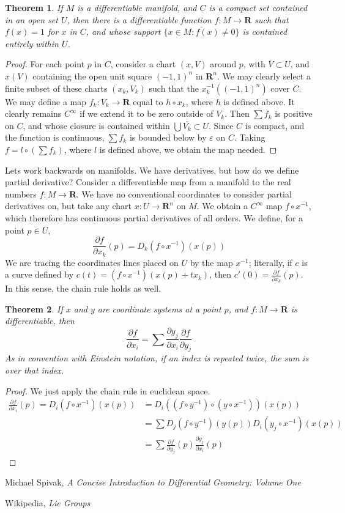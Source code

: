 \documentclass[12pt]{report}
\theoremstyle{plain}
\newtheorem{theorem}{Theorem}[chapter]
\theoremstyle{definition}
\begin{document}
\begin{theorem}
    If $M$ is a differentiable manifold, and $C$ is a compact set contained in an open set $U$, then there is a differentiable function $f:M \to \mathbf{R}$ such that $f(x) = 1$ for $x$ in $C$, and whose support $\overline{\{ x \in M : f(x) \neq 0 \}}$ is contained entirely within $U$.
\end{theorem}
\begin{proof}
    For each point $p$ in $C$, consider a chart $(x,V)$ around $p$, with $\overline{V} \subset U$, and $x(V)$ containing the open unit square $(-1,1)^n$ in $\mathbf{R}^n$. We may clearly select a finite subset of these charts $(x_k,V_k)$ such that the $x_k^{-1}((-1,1)^n)$ cover $C$. We may define a map $f_k:V_k \to \mathbf{R}$ equal to $h \circ x_k$, where $h$ is defined above. It clearly remains $C^\infty$ if we extend it to be zero outside of $V_k$. Then $\sum f_k$ is positive on $C$, and whose closure is contained within $\bigcup \overline{V_k} \subset U$. Since $C$ is compact, and the function is continuous, $\sum f_k$ is bounded below by $\varepsilon$ on $C$. Taking $f = l \circ (\sum f_k)$, where $l$ is defined above, we obtain the map needed.
\end{proof}

Lets work backwards on manifolds. We have derivatives, but how do we define partial derivative? Consider a differentiable map from a manifold to the real numbers $f:M \to \mathbf{R}$. We have no conventional coordinates to consider partial derivatives on, but take any chart $x:U \to \mathbf{R}^n$ on $M$. We obtain a $C^\infty$ map $f \circ x^{-1}$, which therefore has continuous partial derivatives of all orders. We define, for a point $p \in U$,
%
\[ \frac{\partial f}{\partial x_k} (p) = D_k(f \circ x^{-1})(x(p)) \]
%
We are tracing the coordinates lines placed on $U$ by the map $x^{-1}$; literally, if $c$ is a curve defined by $c(t) = (f \circ x^{-1})(x(p) + tx_k)$, then $c'(0) = \frac{\partial f}{\partial x_k}(p)$. In this sense, the chain rule holds as well.

\begin{theorem}
    If $x$ and $y$ are coordinate systems at a point $p$, and $f:M \to \mathbf{R}$ is differentiable, then
    \[ \frac{\partial f}{\partial x_i} = \sum \frac{\partial y_j}{\partial x_i} \frac{\partial f}{\partial y_j} \]
    As in convention with Einstein notation, if an index is repeated twice, the sum is over that index.
\end{theorem}
\begin{proof}
    We just apply the chain rule in euclidean space.
    \begin{align*}
        \frac{\partial f}{\partial x_i}(p) = D_i(f \circ x^{-1})(x(p)) &= D_i((f \circ y^{-1}) \circ (y \circ x^{-1}))(x(p))\\
        &= \sum D_j(f \circ y^{-1})(y(p)) D_i(y_j \circ x^{-1})(x(p))\\
        &= \sum \frac{\partial f}{\partial y_j}(p) \frac{\partial y_j}{\partial x_i}(p)
    \end{align*}
\end{proof}



\begin{thebibliography}{10}
     Michael Spivak,
    \emph{A Concise Introduction to Differential Geometry: Volume One}

     Wikipedia,
    \emph{Lie Groups}
\end{thebibliography}
\end{document}
